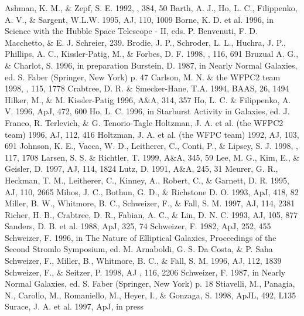 {{{{{{{{{{{{{{\begin{references}
 Ashman, K. M., \& Zepf, S. E. 1992, \apj, 384, 50
  Barth, A. J., Ho, L. C., Filippenko, A. V., \& Sargent, W.L.W. 1995, AJ, 110, 1009
  Borne, K. D. et al. 1996, in Science with the Hubble Space Telescope - II, eds. P. Benvenuti, F. D. Macchetto, \& E. J. Schreier, 239.
 Brodie, J. P., Schroder, L. L., Huchra, J. P., Phillips, A. C., Kissler-Patig, M., \& Forbes, D. F. 1998, \aj, 116, 691
  Bruzual A. G., \& Charlot, S. 1996, in preparation
  Burstein, D. 1987, in Nearly Normal Galaxies, ed. S. Faber (Springer, New York) p. 47
  Carlson, M. N. \& the WFPC2 team 1998, \aj, 115, 1778
  Crabtree, D. R. \& Smecker-Hane, T.A. 1994, BAAS, 26, 1494
  Hilker, M., \& M. Kissler-Patig 1996, A\&A, 314, 357
  Ho, L. C. \& Filippenko, A. V. 1996, ApJ, 472, 600
  Ho, L. C.  1996, in Starburst Activity in Galaxies, ed. J. Franco, R. Terlevich, \& G. Tenorio-Tagle
  Holtzman, J. A. et al. (the WFPC2 team) 1996, AJ, 112, 416
  Holtzman, J. A. et al. (the WFPC team) 1992, AJ, 103, 691
  Johnson, K. E., Vacca, W. D., Leitherer, C., Conti, P., \& Lipsey, S. J. 1998, \aj, 117, 1708
 Larsen, S. S. \& Richtler, T. 1999, A\&A, 345, 59
  Lee, M. G., Kim, E., \& Geisler, D. 1997, AJ, 114, 1824
  Lutz, D. 1991, A\&A, 245, 31
  Meurer, G. R., Heckman, T. M., Leitherer, C., Kinney, A., Robert, C.,  \& Garnett, D. R. 1995, AJ, 110, 2665
 Mihos, J. C.,  Bothun, G. D., \& Richstone D. O. 1993, ApJ, 418, 82
   Miller, B. W., Whitmore, B. C., Schweizer, F., \& Fall, S. M. 1997, AJ, 114, 2381
  Richer, H. B., Crabtree, D. R., Fabian, A. C., \& Lin, D. N. C. 1993, AJ, 105, 877
  Sanders, D. B. et al. 1988, ApJ, 325, 74
  Schweizer, F.  1982, ApJ, 252, 455
  Schweizer, F.  1996,  in The Nature of Elliptical Galaxies, Proceedings of the Second Stromlo Symposium, ed. M. Arnaboldi, G. S. Da Costa, \& P. Saha
  Schweizer, F., Miller, B.,  Whitmore, B. C., \& Fall, S. M. 1996,
AJ, 112, 1839
  Schweizer, F., \& Seitzer, P. 1998, AJ , 116, 2206
  Schweizer, F. 1987, in Nearly Normal Galaxies, ed. S. Faber (Springer, New York) p. 18
  Stiavelli, M., Panagia, N., Carollo, M., Romaniello, M., Heyer, I., \& Gonzaga, S. 1998, ApJL, 492, L135
  Surace, J. A. et al. 1997, ApJ, in press

\end{references}}}}}}}}}}}}}}}
